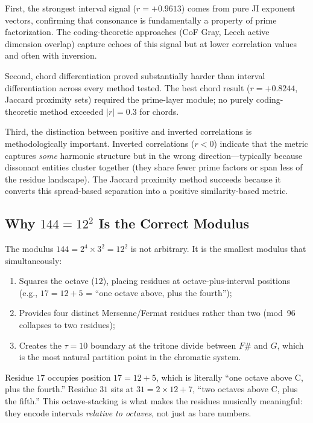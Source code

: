 \documentclass[11pt,a4paper]{article}
\theoremstyle{definition}
\begin{document}
First, the strongest interval signal ($r = +0.9613$) comes from pure JI exponent vectors, confirming that consonance is fundamentally a property of prime factorization. The coding-theoretic approaches (CoF Gray, Leech active dimension overlap) capture echoes of this signal but at lower correlation values and often with inversion.

Second, chord differentiation proved substantially harder than interval differentiation across every method tested. The best chord result ($r = +0.8244$, Jaccard proximity sets) required the prime-layer module; no purely coding-theoretic method exceeded $|r| = 0.3$ for chords.

Third, the distinction between positive and inverted correlations is methodologically important. Inverted correlations ($r < 0$) indicate that the metric captures \emph{some} harmonic structure but in the wrong direction---typically because dissonant entities cluster together (they share fewer prime factors or span less of the residue landscape). The Jaccard proximity method succeeds because it converts this spread-based separation into a positive similarity-based metric.

\subsection{Why $144 = 12^2$ Is the Correct Modulus}

The modulus $144 = 2^4 \times 3^2 = 12^2$ is not arbitrary. It is the smallest modulus that simultaneously:
\begin{enumerate}[leftmargin=2em]
\item Squares the octave (12), placing residues at octave-plus-interval positions (e.g., $17 = 12 + 5$ = ``one octave above, plus the fourth'');
\item Provides four distinct Mersenne/Fermat residues rather than two (mod~96 collapses to two residues);
\item Creates the $\tau = 10$ boundary at the tritone divide between $F\#$ and $G$, which is the most natural partition point in the chromatic system.
\end{enumerate}
Residue $17$ occupies position $17 = 12 + 5$, which is literally ``one octave above C, plus the fourth.'' Residue $31$ sits at $31 = 2 \times 12 + 7$, ``two octaves above C, plus the fifth.'' This octave-stacking is what makes the residues musically meaningful: they encode intervals \emph{relative to octaves}, not just as bare numbers.
\end{document}

